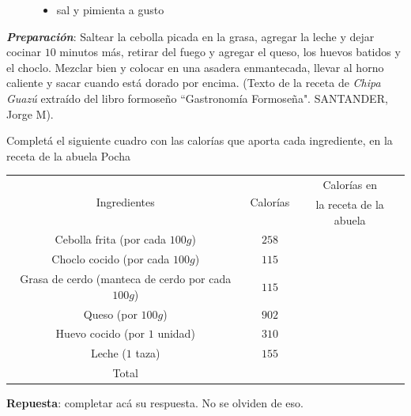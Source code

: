 \documentclass[10pt]{examdesign}
\theoremstyle{plain}
\theoremstyle{definition}
\theoremstyle{remark}
\begin{document}
\begin{shortanswer}[title={\textit{Receta que le dijo la Abuela Pocha a Ana y
    			Juan.}},
    	rearrange=no,resetcounter=no]
\begin{figure}[!h]
\begin{minipage}[b]{0.65\textwidth}
\begin{itemize}
    				\item sal y pimienta a gusto
    			\end{itemize}
    		\end{minipage}
    	\end{figure}
        \vspace{0.2cm}
        \textbf{\textit{\textcolor{upforestgreen}{Preparación}}}:
        \vspace{0.2cm}
        Saltear la cebolla picada en la grasa, agregar la leche y dejar cocinar $10$ minutos más, retirar del fuego y agregar el queso, los huevos batidos y el choclo. Mezclar bien y colocar en una asadera enmantecada, llevar al horno caliente y sacar cuando está dorado por encima. (\textcolor{dukeblue}{Texto de la receta de \textit{Chipa Guazú} extraído del libro formoseño “Gastronomía Formoseña". SANTANDER, Jorge M}).
    	\begin{question}
    		Completá el siguiente cuadro con las calorías que aporta cada ingrediente, en la receta de la abuela Pocha
    		\begin{center}
    			\begin{tabular}{|c|c|c|}
    				\hline 
    				\multirow{2}{*}{Ingredientes} &\multirow{2}{*}{Calorías }&
    				Calorías en
    				\\
    				&&la receta de la abuela\\\hline  
    				Cebolla frita (por cada $100g$)                  & $258$ &     
    				\\\hline
    				Choclo cocido (por cada $100g$)                  & $115$ &     
    				\\\hline
    				Grasa de cerdo (manteca de cerdo por cada $100g$)& $115$ &     
    				\\\hline
    				Queso (por $100g$)                               & $902$ &     
    				\\\hline
    				Huevo cocido (por $1$ unidad)                    & $310$ &     
    				\\\hline
    				Leche ($1$ taza)                                 & $155$ &     
    				\\\hline
    				Total                                            &       &     
    				\\\hline
    			\end{tabular}
    		\end{center}
    		\begin{answer}
    			\textbf{Repuesta}: completar acá su respuesta. No se olviden de eso.

\end{answer}
\end{question}
\end{shortanswer}
\end{document}

